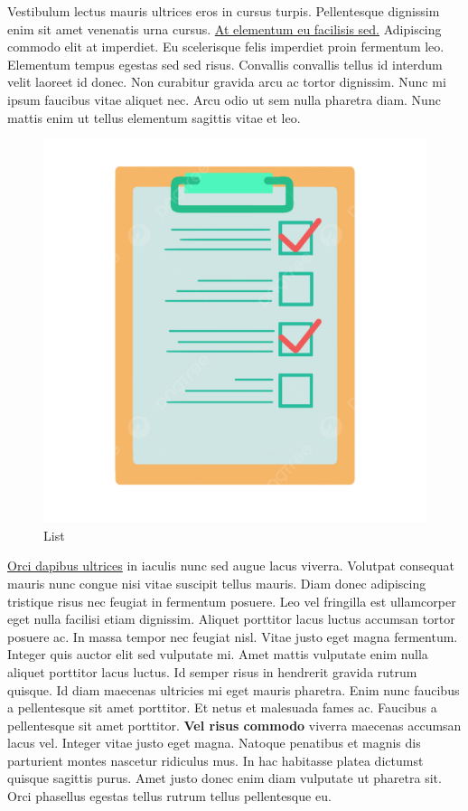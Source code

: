 \documentclass[12pt]{article}
\begin{document}
Vestibulum lectus mauris ultrices eros in cursus turpis. Pellentesque dignissim enim sit amet venenatis urna cursus. \underline{At elementum eu facilisis sed.} Adipiscing commodo elit at imperdiet. Eu scelerisque felis imperdiet proin fermentum leo. Elementum tempus egestas sed sed risus. Convallis convallis tellus id interdum velit laoreet id donec. Non curabitur gravida arcu ac tortor dignissim. Nunc mi ipsum faucibus vitae aliquet nec. Arcu odio ut sem nulla pharetra diam. Nunc mattis enim ut tellus elementum sagittis vitae et leo.

\begin{figure}[h]
    \centering
    \includegraphics[width=0.5\linewidth]{list.png}
    \caption{List}
    \label{fig:list}
\end{figure}

\underline{Orci dapibus ultrices} in iaculis nunc sed augue lacus viverra. Volutpat consequat mauris nunc congue nisi vitae suscipit tellus mauris. Diam donec adipiscing tristique risus nec feugiat in fermentum posuere. Leo vel fringilla est ullamcorper eget nulla facilisi etiam dignissim. Aliquet porttitor lacus luctus accumsan tortor posuere ac. In massa tempor nec feugiat nisl. Vitae justo eget magna fermentum. Integer quis auctor elit sed vulputate mi. Amet mattis vulputate enim nulla aliquet porttitor lacus luctus. Id semper risus in hendrerit gravida rutrum quisque. Id diam maecenas ultricies mi eget mauris pharetra. Enim nunc faucibus a pellentesque sit amet porttitor. Et netus et malesuada fames ac. Faucibus a pellentesque sit amet porttitor. \textbf{Vel risus commodo} viverra maecenas accumsan lacus vel. Integer vitae justo eget magna. Natoque penatibus et magnis dis parturient montes nascetur ridiculus mus. In hac habitasse platea dictumst quisque sagittis purus. Amet justo donec enim diam vulputate ut pharetra sit. Orci phasellus egestas tellus rutrum tellus pellentesque eu.
\end{document}
